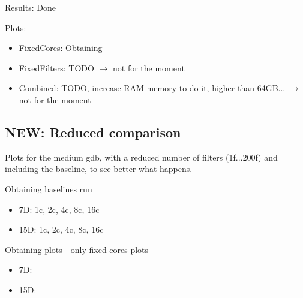 \documentclass[12pt,a4paper]{article}
\begin{document}
Results: Done

Plots:
\begin{itemize}
    \item FixedCores: Obtaining
    \item FixedFilters: TODO $\rightarrow$ not for the moment
    \item Combined: TODO, increase RAM memory to do it, higher than 64GB... $\rightarrow$ not for the moment
\end{itemize}


\subsection{NEW: Reduced comparison}

Plots for the medium gdb, with a reduced number of filters (1f...200f) and including the baseline, to see better what happens.

Obtaining baselines run
\begin{itemize}
    \item 7D: 1c, 2c, 4c, 8c, 16c
    \item 15D: 1c, 2c, 4c, 8c, 16c
\end{itemize}

Obtaining plots - only fixed cores plots
\begin{itemize}
    \item 7D: 
    \item 15D: 
\end{itemize}
\end{document}
